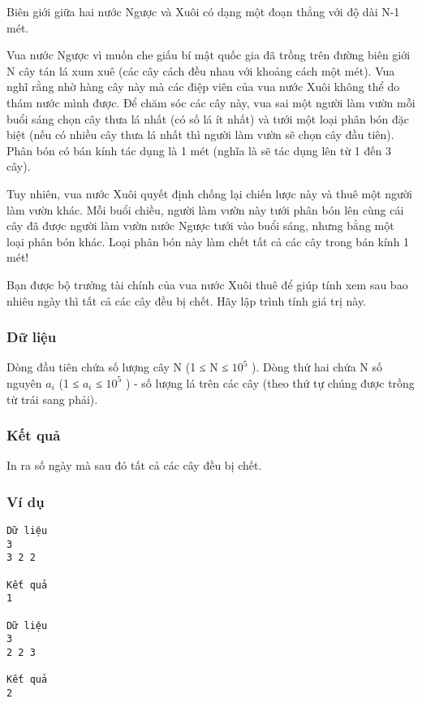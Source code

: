 



   Biên giới giữa hai nước Ngược và Xuôi có dạng một đoạn thẳng với độ dài N-1 mét.  

   Vua nước Ngược vì muốn che giấu bí mật quốc gia đã trồng trên đường biên giới N cây tán lá xum xuê (các cây cách đều nhau với khoảng cách một mét). Vua nghĩ rằng nhờ hàng cây này mà các điệp viên của vua nước Xuôi không thể do thám nước mình được. Để chăm sóc các cây này, vua sai một người làm vườn mỗi buổi sáng chọn cây thưa lá nhất (có số lá ít nhất) và tưới một loại phân bón đặc biệt (nếu có nhiều cây thưa lá nhất thì người làm vườn sẽ chọn cây đầu tiên). Phân bón có bán kính tác dụng là 1 mét (nghĩa là sẽ tác dụng lên từ 1 đến 3 cây).  

   Tuy nhiên, vua nước Xuôi quyết định chống lại chiến lược này và thuê một người làm vườn khác. Mỗi buổi chiều, người làm vườn này tưới phân bón lên cùng cái cây đã được người làm vườn nước Ngược tưới vào buổi sáng, nhưng bằng một loại phân bón khác. Loại phân bón này làm chết tất cả các cây trong bán kính 1 mét!  

   Bạn được bộ trưởng tài chính của vua nước Xuôi thuê để giúp tính xem sau bao nhiêu ngày thì tất cả các cây đều bị chết. Hãy lập trình tính giá trị này.  

\subsubsection{   Dữ liệu  }

   Dòng đầu tiên chứa số lượng cây N (1 ≤ N ≤ $10^{5}$   ). Dòng thứ hai chứa N số nguyên $a_{i}$   (1 ≤ $a_{i}$   ≤ $10^{5}$   ) - số lượng lá trên các cây (theo thứ tự chúng được trồng từ trái sang phải).  

\subsubsection{   Kết quả  }

   In ra số ngày mà sau đó tất cả các cây đều bị chết.  

\subsubsection{   Ví dụ  }
\begin{verbatim}
Dữ liệu
3
3 2 2

Kết quả
1

Dữ liệu
3
2 2 3

Kết quả
2
\end{verbatim}
